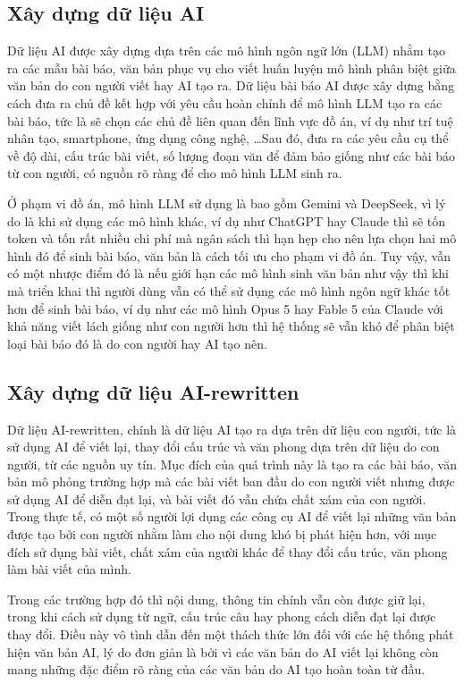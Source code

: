 \subsection{Xây dựng dữ liệu AI}
Dữ liệu AI được xây dựng dựa trên các mô hình ngôn ngữ lớn (LLM) nhằm tạo ra các mẫu bài báo, văn bản phục vụ cho viết huấn luyện mô hình phân biệt giữa văn bản do con người viết hay AI tạo ra. Dữ liệu bài báo AI được xây dựng bằng cách đưa ra chủ đề kết hợp với yêu cầu hoàn chỉnh để mô hình LLM tạo ra các bài báo, tức là sẽ chọn các chủ đề liên quan đến lĩnh vực đồ án, ví dụ như trí tuệ nhân tạo, smartphone, ứng dụng công nghệ, \dots Sau
đó, đưa ra các yêu cầu cụ thể về độ dài, cấu trúc bài viết, số lượng đoạn văn để đảm bảo giống như các bài báo từ con người, có nguồn rõ ràng để cho mô hình LLM sinh ra. 

\vspace{\baselineskip}
\noindent
Ở phạm vi đồ án, mô hình LLM sử dụng là bao gồm Gemini và DeepSeek, vì lý do là khi sử dụng các mô hình khác, ví dụ như ChatGPT hay Claude thì sẽ tốn token và tốn rất nhiều chi phí mà ngân sách thì hạn hẹp cho nên lựa chọn hai mô hình đó để sinh bài báo, văn bản là cách tối ưu
cho phạm vi đồ án. Tuy vậy, vẫn có một nhược điểm đó là nếu giới hạn các mô hình sinh văn bản như vậy thì khi mà triển khai thì người dùng vẫn có thể sử dụng các mô hình ngôn ngữ khác tốt hơn để sinh bài báo, ví dụ như các mô hình Opus 5 hay Fable 5 của Claude với khả năng viết lách giống như con người hơn thì hệ thống sẽ vẫn khó để phân biệt loại bài báo đó là do con người hay AI tạo nên.

\subsection{Xây dựng dữ liệu AI-rewritten}
Dữ liệu AI-rewritten, chính là dữ liệu AI tạo ra dựa trên dữ liệu con người, tức là sử dụng AI để viết lại, thay đổi cấu trúc và văn phong dựa trên dữ liệu do con người, từ các nguồn uy tín. Mục đích của quá trình này là tạo ra các bài báo, văn bản mô phỏng trường hợp mà các bài viết ban đầu do con người viết nhưng được sử dụng AI để diễn đạt lại, và bài viết đó vẫn chứa chất xám của con người. Trong thực tế, có
một số người lợi dụng các công cụ AI để viết lại những văn bản được tạo bởi con người nhằm làm cho nội dung khó bị phát hiện hơn, với mục đích sử dụng bài viết, chất xám của người khác để thay đổi cấu trúc, văn phong làm bài viết của mình. 

\vspace{\baselineskip}
\noindent
Trong các trường hợp đó thì nội dung, thông tin chính vẫn còn được giữ lại, trong khi cách sử dụng từ ngữ, cấu trúc câu hay phong cách diễn đạt lại được thay đổi. Điều này vô tình dẫn đến một thách thức lớn đối với các hệ thống phát hiện văn bản AI, lý do đơn giản là bởi vì các văn bản do AI viết lại không còn mang những đặc điểm rõ ràng của các văn bản do AI tạo hoàn toàn từ đầu.


